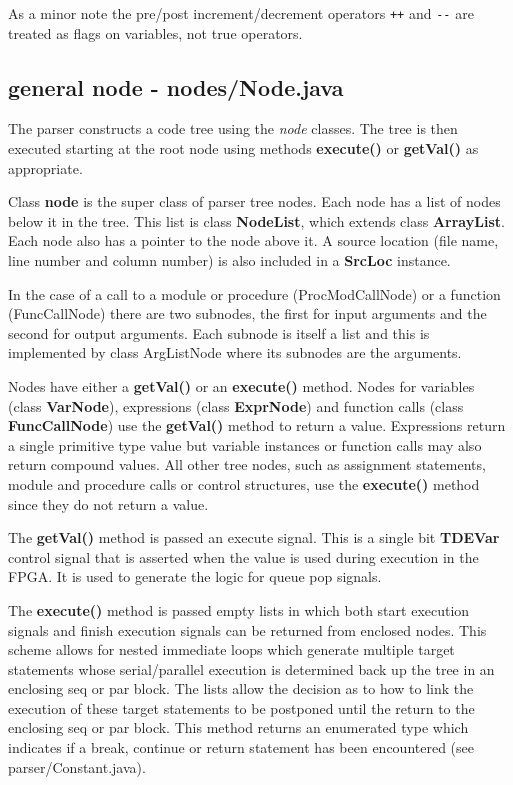 \documentclass[10pt,a4paper,twoside,fleqn]{book}
\begin{document}
        As a minor note the pre/post increment/decrement operators                
        \verb'++' and \verb'--' are treated as flags on variables, not
        true operators.
        
        \subsection{general node - nodes/Node.java}

            The parser constructs a code tree using the {\em node} classes. The
            tree is then executed starting at the root node using methods {\bf
            execute()} or {\bf getVal()} as appropriate.

            Class {\bf node} is the super class of parser tree nodes. Each node has
            a list of nodes below it in the tree. This list is class {\bf
            NodeList}, which extends class {\bf ArrayList}. Each node also has a
            pointer to the node above it. A source location (file name, line number
            and column number) is also included in a {\bf SrcLoc} instance.

            In the case of a call to a module or procedure (ProcModCallNode) or a
            function (FuncCallNode) there are two subnodes, the first for input
            arguments and the second for output arguments. Each subnode is itself a
            list and this is implemented by class ArgListNode where its subnodes
            are the arguments.

            Nodes have either a {\bf getVal()} or an {\bf execute()} method. Nodes
            for variables (class {\bf VarNode}), expressions (class {\bf ExprNode})
            and function calls (class {\bf FuncCallNode}) use the {\bf getVal()}
            method to return a value. Expressions return a single primitive type
            value but variable instances or function calls may also return compound
            values. All other tree nodes, such as assignment statements, module and
            procedure calls or control structures, use the {\bf execute()} method
            since they do not return a value.

            The {\bf getVal()} method is passed an execute signal. This is a single
            bit {\bf TDEVar} control signal that is asserted when the value is used
            during execution in the FPGA. It is used to generate the logic for queue
            pop signals.

            The {\bf execute()} method is passed empty lists in which both start
            execution signals and finish execution signals can be returned from
            enclosed nodes. This scheme allows for nested immediate loops which
            generate multiple target statements whose serial/parallel execution is
            determined back up the tree in an enclosing seq or par block. The lists
            allow the decision as to how to link the execution of these target
            statements to be postponed until the return to the enclosing seq or par
            block. This method returns an enumerated type which indicates if a
            break, continue or return statement has been encountered (see
            parser/Constant.java).
\end{document}
